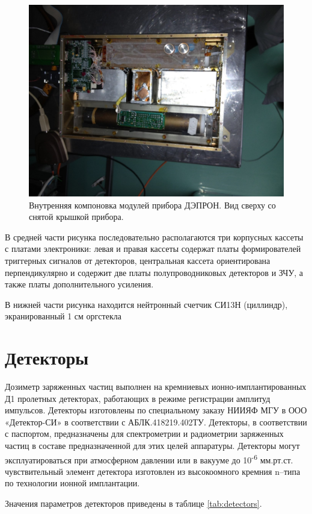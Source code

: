 \begin{figure}
\centering
\includegraphics[width=0.7\linewidth]{images/Depron_inside}
\caption{Внутренняя компоновка модулей прибора ДЭПРОН. Вид сверху со снятой крышкой прибора.}
\label{fig:Depron_inside}
\end{figure}


В средней части рисунка последовательно располагаются три корпусных кассеты с платами электроники: левая и правая кассеты содержат платы формирователей триггерных сигналов от детекторов, центральная кассета ориентирована перпендикулярно и содержит две платы полупроводниковых детекторов и ЗЧУ, а также платы дополнительного усиления.

В нижней части рисунка находится нейтронный счетчик СИ13Н (циллиндр), экранированный 1 см оргстекла

\section{Детекторы}

Дозиметр заряженных частиц выполнен на кремниевых ионно-имплантированных Д1 пролетных детекторах, работающих в режиме регистрации амплитуд импульсов. Детекторы изготовлены по специальному заказу НИИЯФ МГУ в ООО «Детектор-СИ» в соответствии с АБЛК.418219.402ТУ. Детекторы, в соответствии с паспортом, предназначены для спектрометрии и радиометрии заряженных частиц в составе предназначенной для этих целей аппаратуры. Детекторы могут эксплуатироваться при атмосферном давлении или в вакууме до 10\textsuperscript{-6} мм.рт.ст. чувствительный элемент детектора изготовлен из высокоомного кремния n--типа по технологии ионной имплантации.

Значения параметров детекторов приведены в таблице \ref{tab:detectors}.

